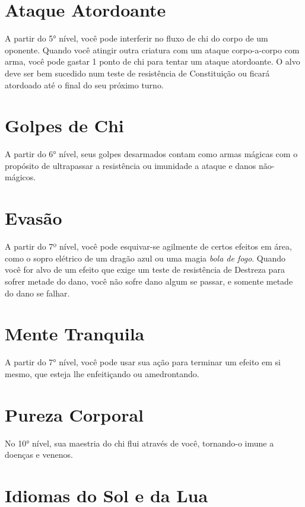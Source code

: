 \begin{multicols}{2}
\section*{Ataque Atordoante}%
\label{sec:ataque_atordoante}

A partir do 5° nível, você pode interferir no fluxo de chi do corpo de um
oponente. Quando você atingir outra criatura com um ataque corpo-a-corpo com
arma, você pode gastar 1 ponto de chi para tentar um ataque atordoante. O alvo
deve ser bem sucedido num teste de resistência de Constituição ou ficará
atordoado até o final do seu próximo turno.

\section*{Golpes de Chi}%
\label{sec:golpes_de_chi}

A partir do 6° nível, seus golpes desarmados contam como armas mágicas com o
propósito de ultrapassar a resistência ou imunidade a ataque e danos
não-mágicos.

\section*{Evasão}%
\label{sec:evasao}

A partir do 7º nível, você pode esquivar-se agilmente de certos efeitos em área,
como o sopro elétrico de um dragão azul ou uma magia \textit{bola de fogo}.
Quando você for alvo de um efeito que exige um teste de resistência de Destreza
para sofrer metade do dano, você não sofre dano algum se passar, e somente
metade do dano se falhar.

\section*{Mente Tranquila}%
\label{sec:mente_tranquila}

A partir do 7° nível, você pode usar sua ação para terminar um efeito em si
mesmo, que esteja lhe enfeitiçando ou amedrontando.

\section*{Pureza Corporal}%
\label{sec:pureza_corporal}

No 10° nível, sua maestria do chi flui através de você, tornando-o imune a
doenças e venenos.

\section*{Idiomas do Sol e da Lua}%
\label{sec:idiomas_do_sol_e_da_lua}


\end{multicols}
